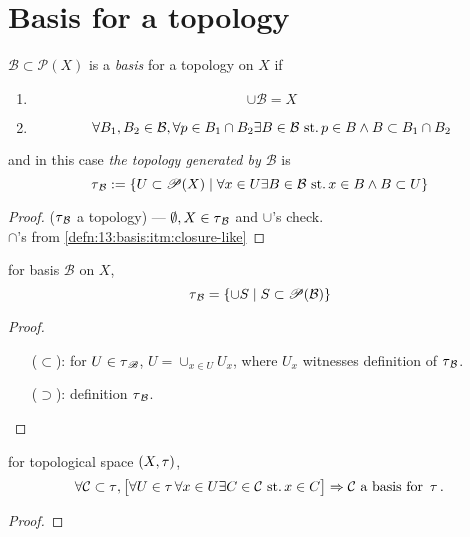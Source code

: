 \section{Basis for a topology}

\begin{defn}\label{defn:13:basis}
  $\mathcal B\subset\mathscr P(X)$
  is a \emph{basis} for a topology on $X$ if
  \begin{enumerate}[label=(\roman*)]
  \item\label{defn:13:basis:itm:union}
    \[ \cup\mathcal B = X \]
  \item\label{defn:13:basis:itm:closure-like}
    \[
    \forall B_1,B_2\in\mathcal B, \forall p\in B_1\cap B_2
    \exists B\in\mathcal B \operatorname{\,st.}
    p\in B\land B\subset B_1\cap B_2
    \]
  \end{enumerate}
  and in this case
  \emph{the topology generated by $\mathcal B$}
  is
  \[\operatorname{\tau}_{\mathcal B} := \{
  U\subset\mathscr P(X)\mid
  \forall x\in U\exists B\in\mathcal B\operatorname{\,st.} x\in B\land B\subset U
  \}\]
\end{defn}
\begin{proof}
  ($\operatorname{\tau}_{\mathcal B}$ a topology) ---
  $\emptyset,X\in\operatorname{\tau}_{\mathcal B}$ and $\cup$'s check.\\
  $\cap$'s from \ref{defn:13:basis:itm:closure-like}
\end{proof}


\begin{lem}\label{lem:13.1}\label{lem:13:gen-topo-char}
  for basis $\mathcal B$ on $X$,
  \[
  \operatorname{\tau}_{\mathcal B} =
  \{\cup S\mid S\subset\mathscr P(\mathcal B)\}
  \]
\end{lem}
\begin{proof}
  \begin{itemize}
  \item[($\subset$):] for $U\in\operatorname{\tau}_{\mathscr B}$,
    $U=\cup_{x\in U} U_x$,
    where $U_x$ witnesses definition of $\operatorname{\tau}_{\mathcal B}$.
  \item[($\supset$):] definition $\operatorname{\tau}_{\mathcal B}$.
  \end{itemize}
\end{proof}

\begin{lem}\label{lem:13.2}\label{lem:13:basis-sufficient}
  for topological space $(X,\operatorname{\tau})$,
  \[
  \forall \mathcal C\subset\operatorname{\tau},
  \big[ \forall U\in\operatorname{\tau}\forall x\in U
    \exists C\in\mathcal C \operatorname{\,st.} x\in C \big] \Rightarrow
  \mathcal C \text{ a basis for } \operatorname{\tau}.
  \]
\end{lem}
\begin{proof}
\end{proof}

